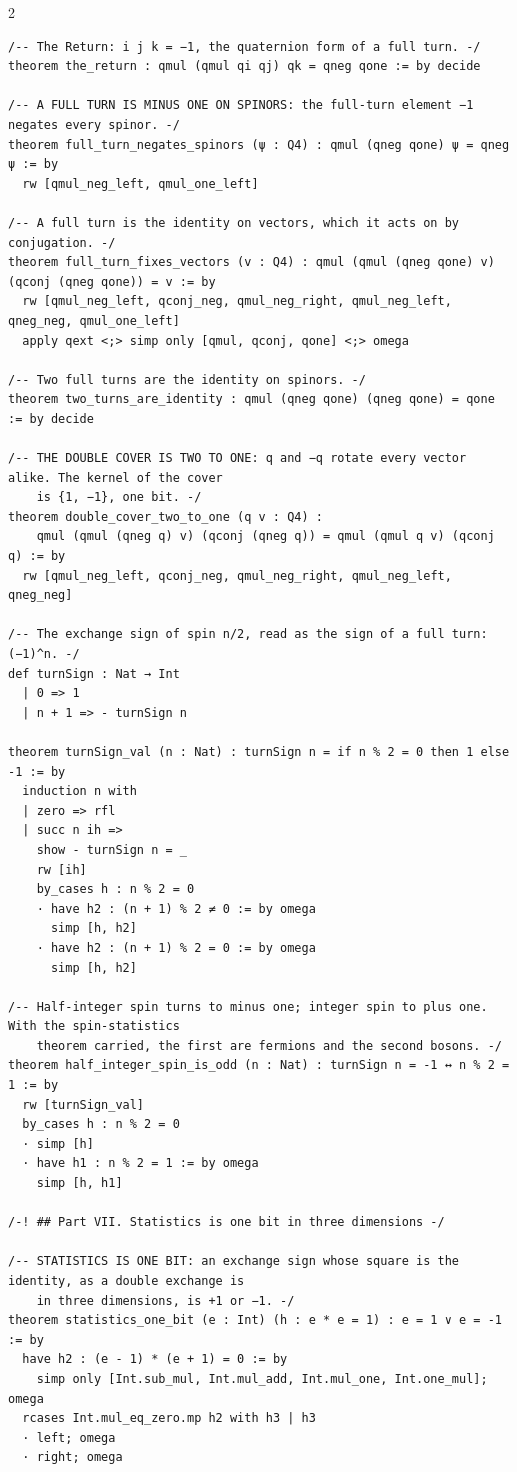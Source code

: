 \documentclass[10pt]{article}
\begin{document}
\begin{multicols}{2}
\begin{Verbatim}[fontsize=\fontsize{6.0}{6.9}\selectfont,breaklines,breakanywhere,breaksymbolleft={}]
/-- The Return: i j k = −1, the quaternion form of a full turn. -/
theorem the_return : qmul (qmul qi qj) qk = qneg qone := by decide

/-- A FULL TURN IS MINUS ONE ON SPINORS: the full-turn element −1 negates every spinor. -/
theorem full_turn_negates_spinors (ψ : Q4) : qmul (qneg qone) ψ = qneg ψ := by
  rw [qmul_neg_left, qmul_one_left]

/-- A full turn is the identity on vectors, which it acts on by conjugation. -/
theorem full_turn_fixes_vectors (v : Q4) : qmul (qmul (qneg qone) v) (qconj (qneg qone)) = v := by
  rw [qmul_neg_left, qconj_neg, qmul_neg_right, qmul_neg_left, qneg_neg, qmul_one_left]
  apply qext <;> simp only [qmul, qconj, qone] <;> omega

/-- Two full turns are the identity on spinors. -/
theorem two_turns_are_identity : qmul (qneg qone) (qneg qone) = qone := by decide

/-- THE DOUBLE COVER IS TWO TO ONE: q and −q rotate every vector alike. The kernel of the cover
    is {1, −1}, one bit. -/
theorem double_cover_two_to_one (q v : Q4) :
    qmul (qmul (qneg q) v) (qconj (qneg q)) = qmul (qmul q v) (qconj q) := by
  rw [qmul_neg_left, qconj_neg, qmul_neg_right, qmul_neg_left, qneg_neg]

/-- The exchange sign of spin n/2, read as the sign of a full turn: (−1)^n. -/
def turnSign : Nat → Int
  | 0 => 1
  | n + 1 => - turnSign n

theorem turnSign_val (n : Nat) : turnSign n = if n % 2 = 0 then 1 else -1 := by
  induction n with
  | zero => rfl
  | succ n ih =>
    show - turnSign n = _
    rw [ih]
    by_cases h : n % 2 = 0
    · have h2 : (n + 1) % 2 ≠ 0 := by omega
      simp [h, h2]
    · have h2 : (n + 1) % 2 = 0 := by omega
      simp [h, h2]

/-- Half-integer spin turns to minus one; integer spin to plus one. With the spin-statistics
    theorem carried, the first are fermions and the second bosons. -/
theorem half_integer_spin_is_odd (n : Nat) : turnSign n = -1 ↔ n % 2 = 1 := by
  rw [turnSign_val]
  by_cases h : n % 2 = 0
  · simp [h]
  · have h1 : n % 2 = 1 := by omega
    simp [h, h1]

/-! ## Part VII. Statistics is one bit in three dimensions -/

/-- STATISTICS IS ONE BIT: an exchange sign whose square is the identity, as a double exchange is
    in three dimensions, is +1 or −1. -/
theorem statistics_one_bit (e : Int) (h : e * e = 1) : e = 1 ∨ e = -1 := by
  have h2 : (e - 1) * (e + 1) = 0 := by
    simp only [Int.sub_mul, Int.mul_add, Int.mul_one, Int.one_mul]; omega
  rcases Int.mul_eq_zero.mp h2 with h3 | h3
  · left; omega
  · right; omega


\end{Verbatim}
\end{multicols}
\end{document}
